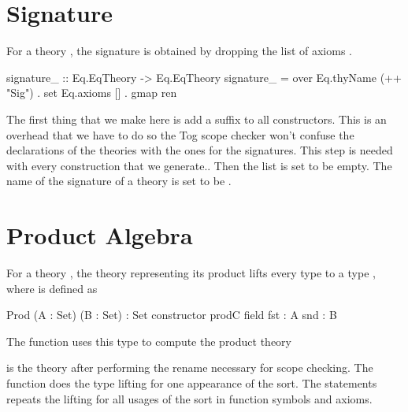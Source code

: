\section{Signature}
For a theory , the signature is obtained by dropping the list of axioms . 
\begin{hscode}
signature_ :: Eq.EqTheory -> Eq.EqTheory
signature_ = over Eq.thyName (++ "Sig") . set Eq.axioms [] .  gmap ren
\end{hscode}
The first thing that we make here is add a suffix  to all constructors. This is an overhead that we have to do so the Tog scope checker won't confuse the declarations of the theories with the ones for the signatures. This step is needed with every construction that we generate.. 
Then the  list is set to be empty. The name of the signature of a theory  is set to be . 

\section{Product Algebra} 
For a theory , the theory  representing its product lifts every type  to a type , where  is defined as 
\begin{togcode}
Prod (A : Set) (B : Set) : Set
  constructor prodC
  field
   fst : A 
   snd : B  
\end{togcode}
The function  uses this type to compute the product theory 
 is the theory after performing the rename necessary for scope checking. The  function does the type lifting for one appearance of the sort. The  statements repeats the lifting for all usages of the sort in function symbols and axioms. 

